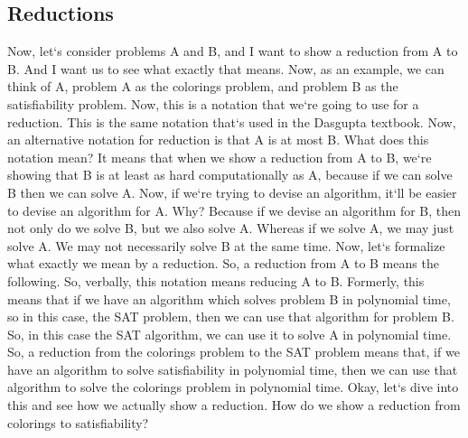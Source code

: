 \subsection{Reductions}
Now, let`s consider problems A and B, and I want to show a reduction from A to B\@.
And I want us to see what exactly that means.
Now, as an example, we can think of A, problem A as the colorings problem, and problem B as the satisfiability problem.
Now, this is a notation that we`re going to use for a reduction.
This is the same notation that`s used in the Dasgupta textbook.
Now, an alternative notation for reduction is that A is at most B\@.
What does this notation mean? It means that when we show a reduction from A to B, we`re showing that B is at least as hard computationally as A, because if we can solve B then we can solve A\@.
Now, if we`re trying to devise an algorithm, it`ll be easier to devise an algorithm for A\@.
Why? Because if we devise an algorithm for B, then not only do we solve B, but we also solve A\@.
Whereas if we solve A, we may just solve A\@.
We may not necessarily solve B at the same time.
Now, let`s formalize what exactly we mean by a reduction.
So, a reduction from A to B means the following.
So, verbally, this notation means reducing A to B\@.
Formerly, this means that if we have an algorithm which solves problem B in polynomial time, so in this case, the SAT problem, then we can use that algorithm for problem B\@.
So, in this case the SAT algorithm, we can use it to solve A in polynomial time.
So, a reduction from the colorings problem to the SAT problem means that, if we have an algorithm to solve satisfiability in polynomial time, then we can use that algorithm to solve the colorings problem in polynomial time.
Okay, let`s dive into this and see how we actually show a reduction.
How do we show a reduction from colorings to satisfiability?

